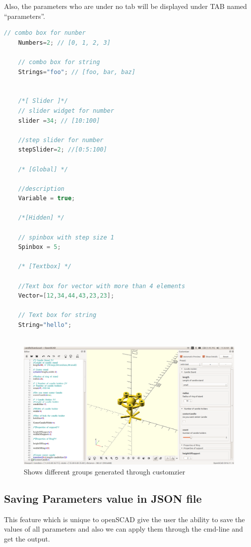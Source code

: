 Also, the parameters who are under no tab will be displayed under TAB named “parameters”.
\begin{lstlisting}[language=c++]
    // combo box for nunber
    Numbers=2; // [0, 1, 2, 3]
   
    // combo box for string
    Strings="foo"; // [foo, bar, baz]
   
   
    /*[ Slider ]*/
    // slider widget for number
    slider =34; // [10:100]
   
    //step slider for number
    stepSlider=2; //[0:5:100]
   
    /* [Global] */
   
    //description
    Variable = true;
   
    /*[Hidden] */
   
    // spinbox with step size 1
    Spinbox = 5;
   
    /* [Textbox] */
   
    //Text box for vector with more than 4 elements
    Vector=[12,34,44,43,23,23];
   
    // Text box for string
    String="hello";
   
\end{lstlisting}

\begin{figure}
    \centering \includegraphics[width=\linewidth]{images/output/6.png}
    \caption{Shows different groups generated through customzier}
    \label{fig:5}
\end{figure}

\subsection{ Saving Parameters value in JSON file}
This feature which is unique to openSCAD give the user the ability to save the values of all parameters and also we can apply them through the cmd-line and get the output.

